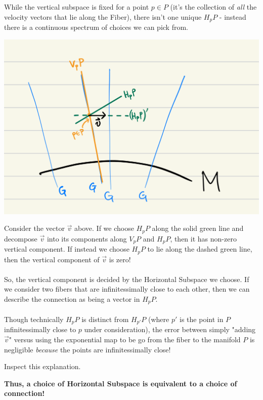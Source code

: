 \documentclass[11pt]{article}
\begin{document}
While the vertical subspace is fixed for a point $p \in P$ (it's the collection of \emph{all} the velocity vectors that lie along the Fiber), there isn't one unique $H_p P$ - instead there is a continuous spectrum of choices we can pick from.
\begin{center}
    \includegraphics*[scale=0.15]{pictures/VpP-and-HpP.png}
\end{center}
Consider the vector $\vec{v}$ above. If we choose $H_p P$ along the solid green line and decompose $\vec{v}$ into its components along $V_p P$ and $H_p P$, then it has non-zero vertical component. If instead we choose $H_pP$ to lie along the dashed green line, then the vertical component of $\vec{v}$ is zero! 
\\
\\
So, the vertical component is decided by the Horizontal Subspace we choose. If we consider two fibers that are infinitessimally close to each other, then we can describe the connection as being a vector in $H_p P$.
\\
\\
Though technically $H_p P$ is distinct from $H_{p'} P$ (where $p'$ is the point in $P$ infinitessimally close to $p$ under consideration), the error between simply "adding $\vec{v}$" versus using the exponential map to be go from the fiber to the manifold $P$ is negligible \emph{because} the points are infinitessimally close! 
\begin{thought}
    {Inspect this explanation.}
\end{thought}

\begin{bluebox}
    \textbf{Thus, a choice of Horizontal Subspace is equivalent to a choice of connection!}
\end{bluebox}
\end{document}
